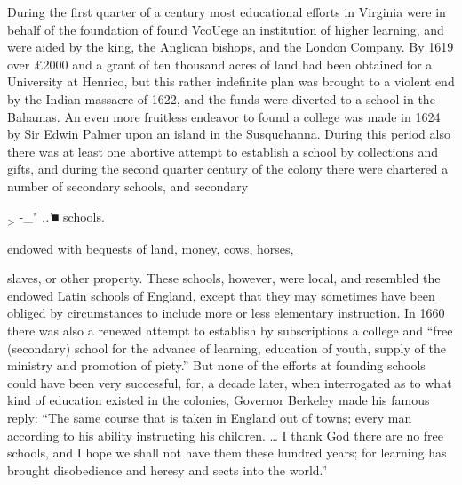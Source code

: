 \documentclass[]{book}
\begin{document}
During the first quarter of a century most educational efforts in Virginia were in behalf of the foundation of found VcoUege an institution of higher learning, and were aided by the king, the Anglican bishops, and the London Company. By 1619 over £2000 and a grant of ten thousand acres of land had been obtained for a University at Henrico, but this rather indefinite plan was brought to a violent end by the Indian massacre of 1622, and the funds were diverted to a school in the Bahamas. An even more fruitless endeavor to found a college was made in 1624 by Sir Edwin Palmer upon an island in the Susquehanna. During this period also there was at least one abortive attempt to establish a school by collections and gifts, and during the second quarter century of the colony there were chartered a number of secondary schools, and secondary

\textsubscript{\textgreater{}} -\_" \emph{..'■} schools.

endowed with bequests of land, money, cows, horses,

slaves, or other property. These schools, however, were local, and resembled the endowed Latin schools of England, except that they may sometimes have been obliged by circumstances to include more or less elementary instruction. In 1660 there was also a renewed attempt to establish by subscriptions a college and ``free (secondary) school for the advance of learning, education of youth, supply of the ministry and promotion of piety.'' But none of the efforts at founding schools could have been very successful, for, a decade later, when interrogated as to what kind of education existed in the colonies, Governor Berkeley made his famous reply: ``The same course that is taken in England out of towns; every man according to his ability instructing his children. \ldots{} I thank God there are no free schools, and I hope we shall not have them these hundred years; for learning has brought disobedience and heresy and sects into the world.''
\end{document}
